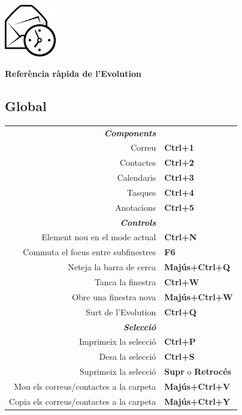 \documentclass[12pt]{article}
\date {}
\begin{document}
	\begin{landscape}


	\begin{center}
	\begin{minipage}[m]
		{1in}\includegraphics[height=0.9in]{../evolution-logo.eps}\hspace{5mm}
	\end{minipage}
	\hspace{5mm}
	\textbf{\Huge{Referència ràpida de l'Evolution}}
	\end{center}

	\begin{center}
	\begin{multicols}{2}
	\section*{Global}
	\begin{tabular*}{5in}{rp{1.5in}}
		\textit{\textbf{Components}}		&					\\
		Correu					& \textbf{Ctrl+1}			\\
		Contactes				& \textbf{Ctrl+2}			\\
		Calendaris				& \textbf{Ctrl+3}			\\
		Tasques					& \textbf{Ctrl+4}			\\
		\vspace{1.5mm}
		Anotacions					& \textbf{Ctrl+5}			\\
		\textit{\textbf{Controls}}		&					\\
		Element nou en el mode actual		& \textbf{Ctrl+N}			\\
		Commuta el focus entre subfinestres		& \textbf{F6}				\\
		Neteja la barra de cerca			& \textbf{Majús+Ctrl+Q}			\\
		Tanca la finestra				& \textbf{Ctrl+W}			\\
		Obre una finestra nova				& \textbf{Majús+Ctrl+W}			\\
		\vspace{1.5mm}
		Surt de l'Evolution				& \textbf{Ctrl+Q}			\\
		\textit{\textbf{Selecció}}		&					\\
		Imprimeix la selecció				& \textbf{Ctrl+P}			\\
		Desa la selecció				& \textbf{Ctrl+S}			\\
		Suprimeix la selecció			& \textbf{Supr} o \textbf{Retrocés}	\\
		Mou els correus/contactes a la carpeta		& \textbf{Majús+Ctrl+V}			\\
		Copia els correus/contactes a la carpeta		& \textbf{Majús+Ctrl+Y}			\\
	\end{tabular*}

\end{multicols}
\end{center}
\end{landscape}
\end{document}

